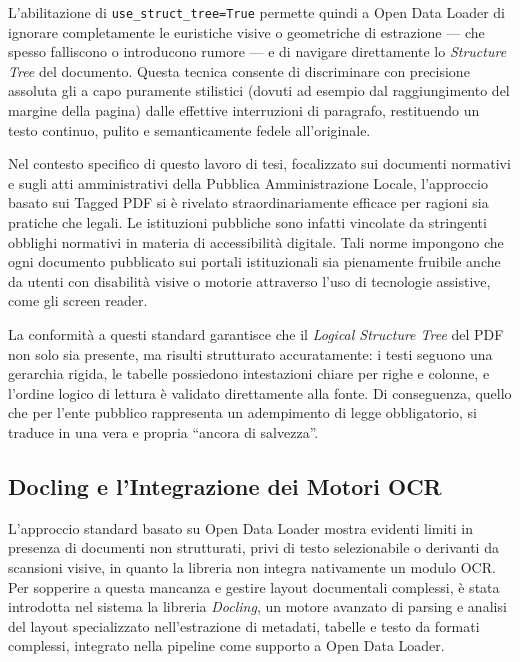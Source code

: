 L'abilitazione di \texttt{use\_struct\_tree=True} permette quindi a Open Data Loader di ignorare completamente le euristiche visive o geometriche di estrazione — che spesso falliscono o introducono rumore — e di navigare direttamente lo \textit{Structure Tree} del documento. Questa tecnica consente di discriminare con precisione assoluta gli a capo puramente stilistici (dovuti ad esempio dal raggiungimento del margine della pagina) dalle effettive interruzioni di paragrafo, restituendo un testo continuo, pulito e semanticamente fedele all'originale.

Nel contesto specifico di questo lavoro di tesi, focalizzato sui documenti normativi e sugli atti amministrativi della Pubblica Amministrazione Locale, l'approccio basato sui Tagged PDF si è rivelato straordinariamente efficace per ragioni sia pratiche che legali. Le istituzioni pubbliche sono infatti vincolate da stringenti obblighi normativi in materia di accessibilità digitale. Tali norme impongono che ogni documento pubblicato sui portali istituzionali sia pienamente fruibile anche da utenti con disabilità visive o motorie attraverso l'uso di tecnologie assistive, come gli screen reader.

La conformità a questi standard garantisce che il \textit{Logical Structure Tree} del PDF non solo sia presente, ma risulti strutturato accuratamente: i testi seguono una gerarchia rigida, le tabelle possiedono intestazioni chiare per righe e colonne, e l'ordine logico di lettura è validato direttamente alla fonte. Di conseguenza, quello che per l'ente pubblico rappresenta un adempimento di legge obbligatorio, si traduce in una vera e propria ``ancora di salvezza''.


\subsection{Docling e l'Integrazione dei Motori OCR}
L'approccio standard basato su Open Data Loader mostra evidenti limiti in presenza di documenti non strutturati, privi di testo selezionabile o derivanti da scansioni visive, in quanto la libreria non integra nativamente un modulo OCR. Per sopperire a questa mancanza e gestire layout documentali complessi, è stata introdotta nel sistema la libreria \textit{Docling}, un motore avanzato di parsing e analisi del layout specializzato nell'estrazione di metadati, tabelle e testo da formati complessi, integrato nella pipeline come supporto a Open Data Loader.

